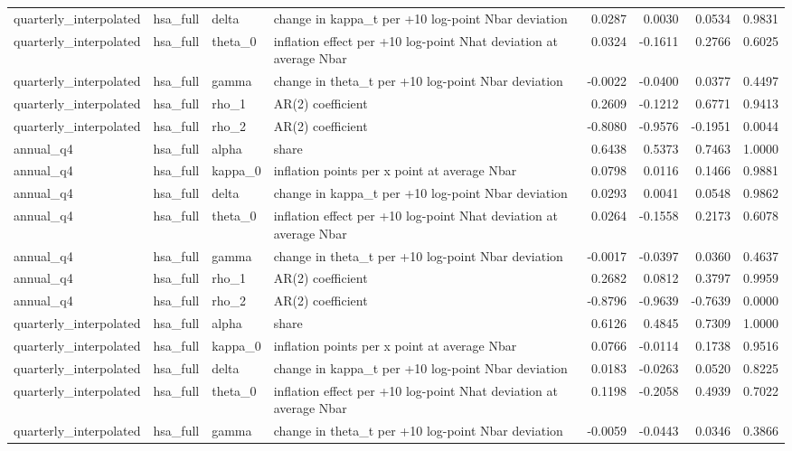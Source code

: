 \begin{tabular}{llllrrrr}
quarterly\_interpolated & hsa\_full & delta & change in kappa\_t per +10 log-point Nbar deviation & 0.0287 & 0.0030 & 0.0534 & 0.9831 \\
quarterly\_interpolated & hsa\_full & theta\_0 & inflation effect per +10 log-point Nhat deviation at average Nbar & 0.0324 & -0.1611 & 0.2766 & 0.6025 \\
quarterly\_interpolated & hsa\_full & gamma & change in theta\_t per +10 log-point Nbar deviation & -0.0022 & -0.0400 & 0.0377 & 0.4497 \\
quarterly\_interpolated & hsa\_full & rho\_1 & AR(2) coefficient & 0.2609 & -0.1212 & 0.6771 & 0.9413 \\
quarterly\_interpolated & hsa\_full & rho\_2 & AR(2) coefficient & -0.8080 & -0.9576 & -0.1951 & 0.0044 \\
annual\_q4 & hsa\_full & alpha & share & 0.6438 & 0.5373 & 0.7463 & 1.0000 \\
annual\_q4 & hsa\_full & kappa\_0 & inflation points per x point at average Nbar & 0.0798 & 0.0116 & 0.1466 & 0.9881 \\
annual\_q4 & hsa\_full & delta & change in kappa\_t per +10 log-point Nbar deviation & 0.0293 & 0.0041 & 0.0548 & 0.9862 \\
annual\_q4 & hsa\_full & theta\_0 & inflation effect per +10 log-point Nhat deviation at average Nbar & 0.0264 & -0.1558 & 0.2173 & 0.6078 \\
annual\_q4 & hsa\_full & gamma & change in theta\_t per +10 log-point Nbar deviation & -0.0017 & -0.0397 & 0.0360 & 0.4637 \\
annual\_q4 & hsa\_full & rho\_1 & AR(2) coefficient & 0.2682 & 0.0812 & 0.3797 & 0.9959 \\
annual\_q4 & hsa\_full & rho\_2 & AR(2) coefficient & -0.8796 & -0.9639 & -0.7639 & 0.0000 \\
quarterly\_interpolated & hsa\_full & alpha & share & 0.6126 & 0.4845 & 0.7309 & 1.0000 \\
quarterly\_interpolated & hsa\_full & kappa\_0 & inflation points per x point at average Nbar & 0.0766 & -0.0114 & 0.1738 & 0.9516 \\
quarterly\_interpolated & hsa\_full & delta & change in kappa\_t per +10 log-point Nbar deviation & 0.0183 & -0.0263 & 0.0520 & 0.8225 \\
quarterly\_interpolated & hsa\_full & theta\_0 & inflation effect per +10 log-point Nhat deviation at average Nbar & 0.1198 & -0.2058 & 0.4939 & 0.7022 \\
quarterly\_interpolated & hsa\_full & gamma & change in theta\_t per +10 log-point Nbar deviation & -0.0059 & -0.0443 & 0.0346 & 0.3866 \\

\end{tabular}
